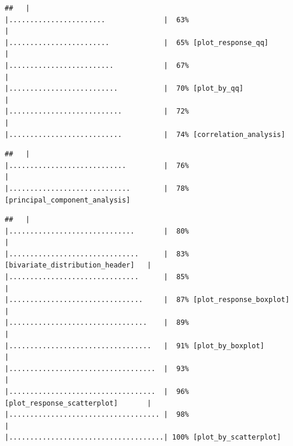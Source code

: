 \documentclass[
]{article}
\begin{document}
\begin{verbatim}
##   |                                             |.......................              |  63%                                   |                                             |........................             |  65% [plot_response_qq]                |                                             |.........................            |  67%                                   |                                             |..........................           |  70% [plot_by_qq]                      |                                             |...........................          |  72%                                   |                                             |...........................          |  74% [correlation_analysis]
\end{verbatim}

\begin{verbatim}
##   |                                             |............................         |  76%                                   |                                             |.............................        |  78% [principal_component_analysis]
\end{verbatim}

\begin{verbatim}
##   |                                             |..............................       |  80%                                   |                                             |...............................      |  83% [bivariate_distribution_header]   |                                             |...............................      |  85%                                   |                                             |................................     |  87% [plot_response_boxplot]           |                                             |.................................    |  89%                                   |                                             |..................................   |  91% [plot_by_boxplot]                 |                                             |...................................  |  93%                                   |                                             |...................................  |  96% [plot_response_scatterplot]       |                                             |.................................... |  98%                                   |                                             |.....................................| 100% [plot_by_scatterplot]           
\end{verbatim}
\end{document}
